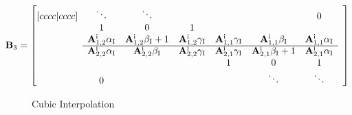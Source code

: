 \documentclass[dvipsnames]{article}
\begin{document}
\begin{equation}
    \mathbf{B}_3 = \begin{bmatrix}[cccc|cccc]
     & \ddots  &\ddots & & & & 0 & \\
       & 1 & 0 & 1 & & & & \\
      & \mathbf{A}_{1, 2}^\text{i}\alpha_\text{I} &\mathbf{A}_{1, 2}^\text{i}\beta_\text{I} + 1 &\mathbf{A}_{1, 2}^\text{i}\gamma_\text{I} & \mathbf{A}_{1, 1}^\text{i}\gamma_\text{I} & \mathbf{A}_{1, 1}^\text{i}\beta_\text{I}& \mathbf{A}_{1, 1}^\text{i}\alpha_\text{I}\\ \cline{2-7}
      &\mathbf{A}_{2, 2}^\text{i}\alpha_\text{I} &\mathbf{A}_{2, 2}^\text{i}\beta_\text{I}&\mathbf{A}_{2, 2}^\text{i}\gamma_\text{I} & \mathbf{A}^\text{i}_{2,1}\gamma_\text{I} & \mathbf{A}^\text{i}_{2,1}\beta_\text{I}+ 1 &\mathbf{A}_{2, 1}^\text{i}\alpha_\text{I} & \\
         & & & &1 & 0 & 1  \\
         & 0 & &  &  &\ddots & \ddots &
    \end{bmatrix}
\end{equation}
\begin{figure}[h]
    \centering
    \hspace{0.05\textwidth}
    \caption{Cubic Interpolation}\label{fig:cubAddInCenter}
\end{figure}
\end{document}
